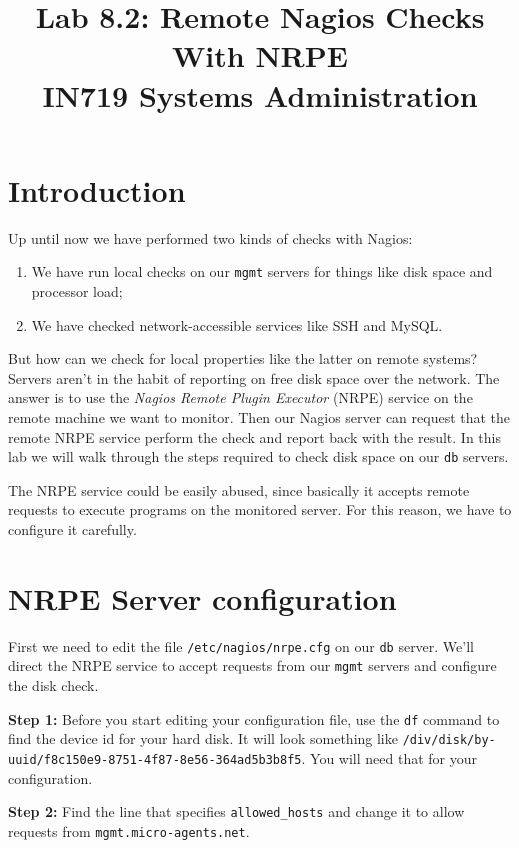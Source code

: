 \documentclass{article}   	%
\title{Lab 8.2:  Remote Nagios Checks With NRPE\\ IN719 Systems Administration}
\date{}							%
\begin{document}
\maketitle

\section*{Introduction}
Up until now we have performed two kinds of checks with Nagios:

\begin{enumerate}
  \item We have run local checks on our \texttt{mgmt} servers for things like disk space and processor load;
  \item We have checked network-accessible services like SSH and MySQL.
\end{enumerate}

But how can we check for local properties like the latter on remote systems?  Servers aren't in the habit of reporting on free disk space over the network.  The answer is to use the \emph{Nagios Remote Plugin Executor} (NRPE) service on the remote machine we want to monitor.  Then our Nagios server can request that the remote NRPE service perform the check and report back with the result.  In this lab we will walk through the steps required to check disk space on our \texttt{db} servers.

The NRPE service could be easily abused, since basically it accepts remote requests to execute programs on the monitored server.  For this reason, we have to configure it carefully.

\section{NRPE Server configuration}
First we need to edit the file \texttt{/etc/nagios/nrpe.cfg} on our \texttt{db} server.  We'll direct the NRPE service to accept requests from our \texttt{mgmt} servers and configure the disk check.

\textbf{Step 1:} Before you start editing your configuration file, use the \texttt{df} command to find the device id for your hard disk.  It will look something like \texttt{/div/disk/by-uuid/f8c150e9-8751-4f87-8e56-364ad5b3b8f5}.  You will need that for your configuration.

\textbf{Step 2:} Find the line that specifies \texttt{allowed\_hosts} and change it to allow requests from \texttt{mgmt.micro-agents.net}.
\end{document}
